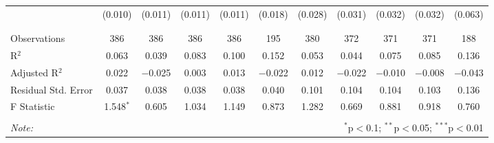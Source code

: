 \begin{table}[H]
\begin{tabular}{@{\extracolsep{4pt}}lcccccccccc}
  & (0.010) & (0.011) & (0.011) & (0.011) & (0.018) & (0.028) & (0.031) & (0.032) & (0.032) & (0.063) \\ 
  & & & & & & & & & & \\ 
\hline \\[-1.8ex] 
Observations & 386 & 386 & 386 & 386 & 195 & 380 & 372 & 371 & 371 & 188 \\ 
R$^{2}$ & 0.063 & 0.039 & 0.083 & 0.100 & 0.152 & 0.053 & 0.044 & 0.075 & 0.085 & 0.136 \\ 
Adjusted R$^{2}$ & 0.022 & $-$0.025 & 0.003 & 0.013 & $-$0.022 & 0.012 & $-$0.022 & $-$0.010 & $-$0.008 & $-$0.043 \\ 
Residual Std. Error & 0.037 & 0.038 & 0.038 & 0.038 & 0.040 & 0.101 & 0.104 & 0.104 & 0.103 & 0.136 \\ 
F Statistic & 1.548$^{*}$ & 0.605 & 1.034 & 1.149 & 0.873 & 1.282 & 0.669 & 0.881 & 0.918 & 0.760 \\ 
\hline 
\hline \\[-1.8ex] 
\textit{Note:}  & \multicolumn{10}{r}{$^{*}$p$<$0.1; $^{**}$p$<$0.05; $^{***}$p$<$0.01} \\ 
\end{tabular} 
\end{table} 
